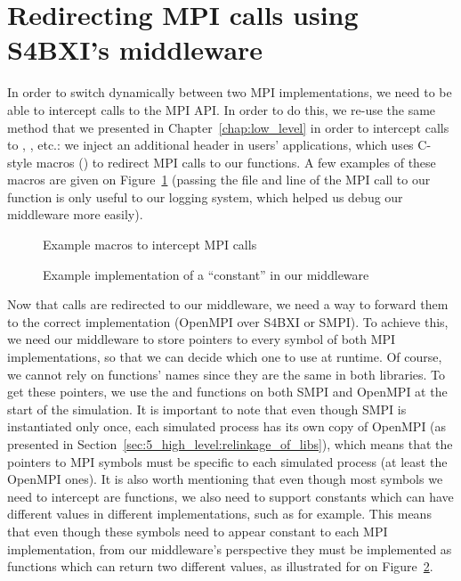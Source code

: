 \section{Redirecting MPI calls using S4BXI's middleware}
\label{sec:6_model_change:interception}

In order to switch dynamically between two MPI implementations, we need to be
able to intercept calls to the MPI API. In order to do this, we re-use the same
method that we presented in Chapter~\ref{chap:low_level} in order to intercept
calls to , , etc.: we inject an additional
header in users' applications, which uses C-style macros () to
redirect MPI calls to our functions. A few examples of these macros are given on
Figure~\ref{fig:6_model_change:middleware_macros} (passing the file and line of
the MPI call to our function is only useful to our logging system, which helped
us debug our middleware more easily).

\begin{figure}[!ht]
    
    \caption{Example macros to intercept MPI calls}
    \label{fig:6_model_change:middleware_macros}
\end{figure}

\begin{figure}[!b]
    
    \caption{Example implementation of a ``constant'' in our middleware}
    \label{fig:6_model_change:smpi_request_null}
\end{figure}

Now that calls are redirected to our middleware, we need a way to forward them
to the correct implementation (OpenMPI over S4BXI or SMPI). To achieve this, we
need our middleware to store pointers to every symbol of both MPI
implementations, so that we can decide which one to use at runtime. Of course,
we cannot rely on functions' names since they are the same in both libraries.
To get these pointers, we use the  and  functions
on both SMPI and OpenMPI at the start of the simulation. It is important to note
that even though SMPI is instantiated only once, each simulated process has its
own copy of OpenMPI (as presented in
Section~\ref{sec:5_high_level:relinkage_of_libs}), which means that the pointers
to MPI symbols must be specific to each simulated process (at least the OpenMPI
ones). It is also worth mentioning that even though most symbols we need to
intercept are functions, we also need to support constants which can have
different values in different implementations, such as 
for example. This means that even though these symbols need to appear constant
to each MPI implementation, from our middleware's perspective they must be
implemented as functions which can return two different values, as illustrated
for  on
Figure~\ref{fig:6_model_change:smpi_request_null}.

